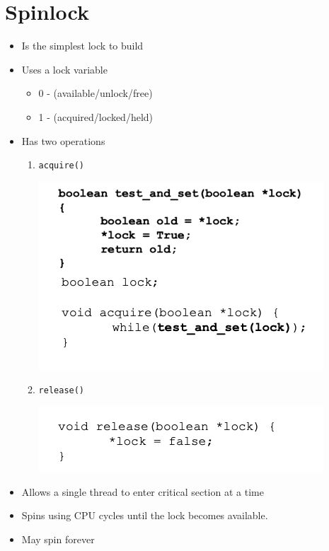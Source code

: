 \documentclass[12pt]{article}
\begin{document}
\section{Spinlock}
\begin{itemize}
    \item Is the simplest lock to build
    \item Uses a lock variable

    \begin{itemize}
        \item 0 - (available/unlock/free)
        \item 1 - (acquired/locked/held)
    \end{itemize}

    \item Has two operations

    \begin{enumerate}[1.]
        \item \texttt{acquire()}

        \bigskip

        \begin{center}
        \includegraphics[width=0.7\linewidth]{../images/midterm_2_solution_3.png}
        \end{center}

        \bigskip

        \item \texttt{release()}

        \bigskip

        \begin{center}
        \includegraphics[width=0.7\linewidth]{../images/midterm_2_solution_4.png}
        \end{center}

        \bigskip
    \end{enumerate}
    \item Allows a single thread to enter critical section at a time
    \item Spins using CPU cycles until the lock becomes available.
    \item May spin forever
\end{itemize}
\end{document}
